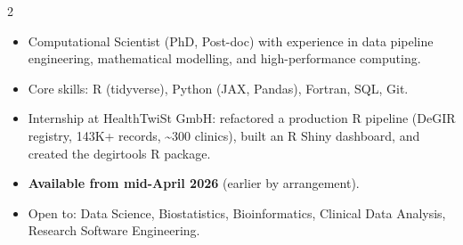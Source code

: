 \documentclass{thejus_cv}
\begin{document}
\begin{paracol}{2}


\begin{itemize}[label=\textbullet, leftmargin=1em]
    \item Computational Scientist (PhD, Post-doc) with experience in data pipeline engineering, mathematical modelling, and high-performance computing.
    \item Core skills: R (tidyverse), Python (JAX, Pandas), Fortran, SQL, Git.
    \item Internship at HealthTwiSt GmbH: refactored a production R pipeline (DeGIR registry, 143K+ records, \textasciitilde300 clinics), built an R Shiny dashboard, and created the degirtools R package.
    \item \textbf{Available from mid-April 2026} (earlier by arrangement).
    \item Open to: Data Science, Biostatistics, Bioinformatics, Clinical Data Analysis, Research Software Engineering.
\end{itemize}



\end{paracol}
\end{document}
